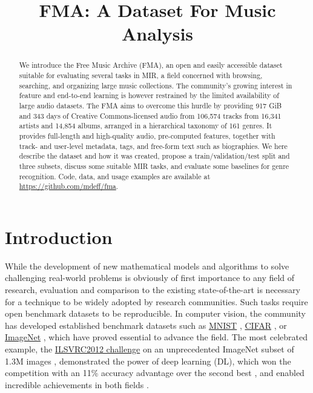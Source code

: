 \documentclass{article}
\title{FMA: A Dataset For Music Analysis}
\newcommand{\ntracks}{106,574 }
\newcommand{\nartists}{16,341 }
\newcommand{\nalbums}{14,854 }
\newcommand{\ngenres}{161 }
\newcommand{\tduration}{343 }
\newcommand{\size}{917 }
\newcommand{\weblink}{https://github.com/mdeff/fma}
\begin{document}
\maketitle

\begin{abstract}
We introduce the Free Music Archive (FMA), an open and easily accessible dataset suitable for evaluating several tasks in MIR, a field concerned with browsing, searching, and organizing large music collections.
The community's growing interest in feature and end-to-end learning is however restrained by the limited availability of large audio datasets.
The FMA aims to overcome this hurdle by providing \size GiB and \tduration days of Creative Commons-licensed audio from \ntracks tracks from \nartists artists and \nalbums albums, arranged in a hierarchical taxonomy of \ngenres genres.
It provides full-length and high-quality audio, pre-computed features, together with track- and user-level metadata, tags, and free-form text such as biographies.
We here describe the dataset and how it was created, propose a train/validation/test split and three subsets, discuss some suitable MIR tasks, and evaluate some
baselines for genre recognition.
Code, data, and usage examples are available at \url{\weblink}.
\end{abstract}

\section{Introduction} %


While the development of new mathematical models and algorithms to solve challenging real-world problems is obviously of first importance to any field of research, evaluation and comparison to the existing state-of-the-art is necessary for a technique to be widely adopted by research communities. Such tasks require open benchmark datasets to be reproducible. %
In computer vision, the community has developed established benchmark datasets such as \href{http://yann.lecun.com/exdb/mnist/}{MNIST} \cite{mnist}, \href{https://www.cs.toronto.edu/~kriz/cifar.html}{CIFAR} \cite{cifar}, or \href{http://www.image-net.org}{ImageNet} \cite{imagenet}, which have proved essential to advance the field. The most celebrated example, the \href{http://www.image-net.org/challenges/LSVRC/2012/}{ILSVRC2012 challenge} on an unprecedented ImageNet subset of 1.3M images \cite{imagenet_challenge}, demonstrated the power of deep learning (DL), which won the competition with an 11\% accuracy advantage over the second best \cite{convnet_imagenet}, and enabled incredible achievements in both fields \cite{dl}.
\end{document}
